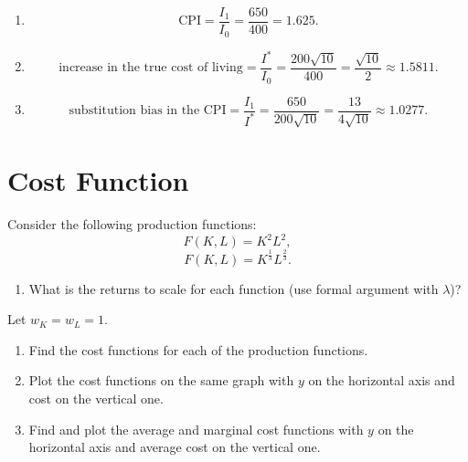 \documentclass[12pt,a4paper]{article}
\begin{document}
\begin{enumerate}[label=(\alph*)]
\begin{enumerate}[label=(b.\arabic*)]
    \item
    \[
      \mathrm{CPI}=\frac{I_1}{I_0}=\frac{650}{400}=1.625.
    \]
  
    \item
    \[
      \text{increase in the true cost of living}
      =\frac{I^*}{I_0}
      =\frac{200\sqrt{10}}{400}
      =\frac{\sqrt{10}}{2}
      \approx 1.5811.
    \]
  
    \item
    \[
      \text{substitution bias in the CPI}
      =\frac{I_1}{I^*}
      =\frac{650}{200\sqrt{10}}
      =\frac{13}{4\sqrt{10}}
      \approx 1.0277.
    \]
  \end{enumerate}
\end{enumerate}




\section{Cost Function}
Consider the following production functions:
\[
    F(K,L)=K^2L^2,
\]
\[
    F(K,L)=K^{\frac{1}{3}}L^{\frac{2}{3}}.
\]

\begin{enumerate}[label=\alph*.]
    \item What is the returns to scale for each function (use formal argument with \(\lambda\))?
\end{enumerate}

Let \(w_K=w_L=1\).

\begin{enumerate}[resume,label=\alph*.]
    \item Find the cost functions for each of the production functions.

    \item Plot the cost functions on the same graph with \(y\) on the horizontal axis and cost on the vertical one.

    \item Find and plot the average and marginal cost functions with \(y\) on the horizontal axis and average cost on the vertical one.
\end{enumerate}

\vspace{0.5cm}
\end{document}
